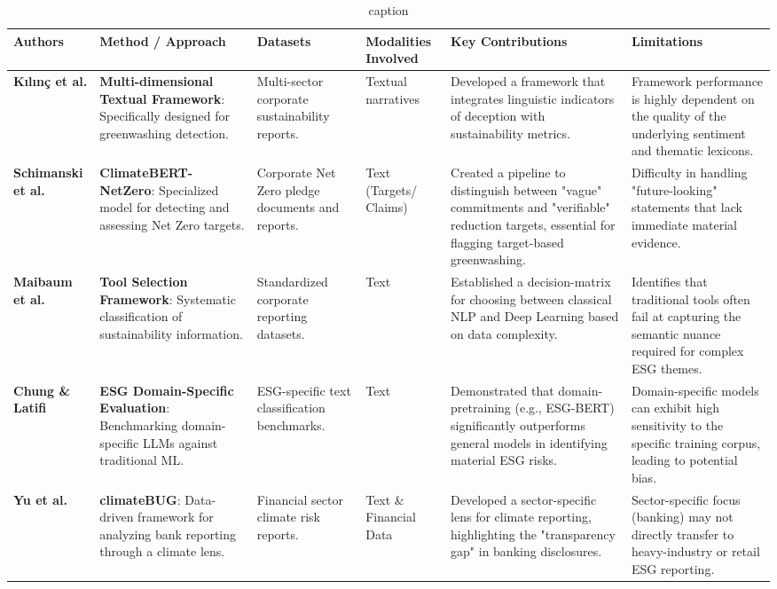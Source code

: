 \begin{landscape}
\begin{table}[p]
\centering
\caption{caption}
\label{label}
\small
\renewcommand{\arraystretch}{1.2}
\begin{tabularx}{\linewidth}{|p{1.8cm}|X|X|p{1.8cm}|X|X|}
\hline
Authors & Method / Approach & Datasets & Modalities Involved & Key Contributions & Limitations \\ \hline
\textbf{Kılınç et al.}  \parencite{yavuz_k_l_n__64e32f80} & \textbf{Multi-dimensional Textual Framework}: Specifically designed for greenwashing detection. & Multi-sector corporate sustainability reports. & Textual narratives & Developed a framework that integrates linguistic indicators of deception with sustainability metrics. & Framework performance is highly dependent on the quality of the underlying sentiment and thematic lexicons. \\ \hline
\textbf{Schimanski et al.}  \parencite{tobias_schimanski_241ada20} & \textbf{ClimateBERT-NetZero}: Specialized model for detecting and assessing Net Zero targets. & Corporate Net Zero pledge documents and reports. & Text (Targets/ Claims) & Created a pipeline to distinguish between "vague" commitments and "verifiable" reduction targets, essential for flagging target-based greenwashing. & Difficulty in handling "future-looking" statements that lack immediate material evidence. \\ \hline
\textbf{Maibaum et al.}  \parencite{frederik_maibaum_b8629037} & \textbf{Tool Selection Framework}: Systematic classification of sustainability information. & Standardized corporate reporting datasets. & Text & Established a decision-matrix for choosing between classical NLP and Deep Learning based on data complexity. & Identifies that traditional tools often fail at capturing the semantic nuance required for complex ESG themes. \\ \hline
\textbf{Chung \& Latifi}  \parencite{tae_sun_chung_e16a4c18} & \textbf{ESG Domain-Specific Evaluation}: Benchmarking domain-specific LLMs against traditional ML. & ESG-specific text classification benchmarks. & Text & Demonstrated that domain-pretraining (e.g., ESG-BERT) significantly outperforms general models in identifying material ESG risks. & Domain-specific models can exhibit high sensitivity to the specific training corpus, leading to potential bias. \\ \hline
\textbf{Yu et al.}  \parencite{yinan_yu_e282fd98} & \textbf{climateBUG}: Data-driven framework for analyzing bank reporting through a climate lens. & Financial sector climate risk reports. & Text \& Financial Data & Developed a sector-specific lens for climate reporting, highlighting the "transparency gap" in banking disclosures. & Sector-specific focus (banking) may not directly transfer to heavy-industry or retail ESG reporting. \\ \hline

\end{tabularx}
\end{table}
\end{landscape}
